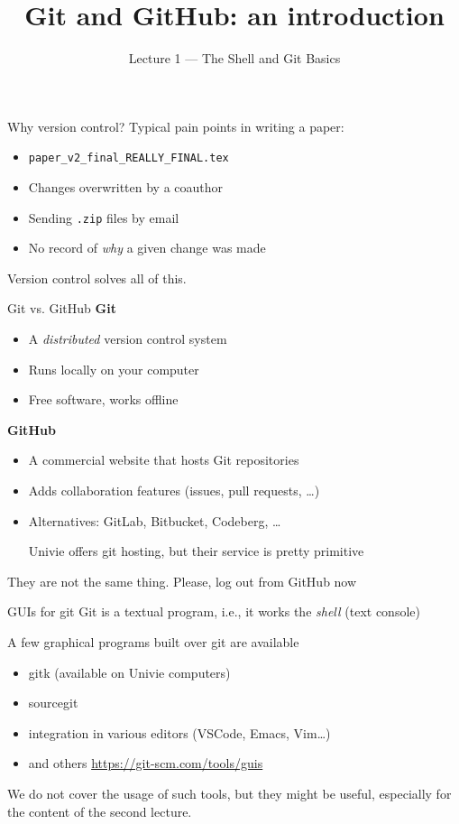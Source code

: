 \documentclass[11pt]{beamer}
\title{Git and GitHub: an introduction}
\subtitle{Lecture 1 --- The Shell and Git Basics}
\author{}
\date{}
\begin{document}
\begin{frame}
  \titlepage
\end{frame}


\begin{frame}{Why version control?}
  Typical pain points in writing a paper:
  \begin{itemize}
    \item \texttt{paper\_v2\_final\_REALLY\_FINAL.tex}
    \item Changes overwritten by a coauthor
    \item Sending \texttt{.zip} files by email
    \item No record of \emph{why} a given change was made
  \end{itemize}
  \vfill
  Version control solves all of this.
\end{frame}

\begin{frame}{Git vs. GitHub}
  \textbf{Git}
  \begin{itemize}
    \item A \emph{distributed} version control system
    \item Runs locally on your computer
    \item Free software, works offline
  \end{itemize}
  \vfill
  \textbf{GitHub}
  \begin{itemize}
    \item A commercial website that hosts Git repositories
    \item Adds collaboration features (issues, pull requests, \ldots)
    \item Alternatives: GitLab, Bitbucket, Codeberg, \ldots

      Univie offers git hosting, but their service is pretty primitive
  \end{itemize}
  \vfill
  \alert{They are not the same thing.}
  \vfill
  Please, log out from GitHub now
\end{frame}

\begin{frame}{GUIs for git}
  Git is a textual program, i.e., it works the
  \emph{shell} (text console)

  \vfill
  A few graphical programs built over git are available
  \begin{itemize}
  \item gitk  (available on Univie computers)
  \item sourcegit
  \item integration in various editors (VSCode, Emacs, Vim\ldots)
  \item and others \url{https://git-scm.com/tools/guis}
  \end{itemize}

  We do not cover the usage of such tools, but they might be useful,
  especially for the content of the second lecture.
\end{frame}
\end{document}
